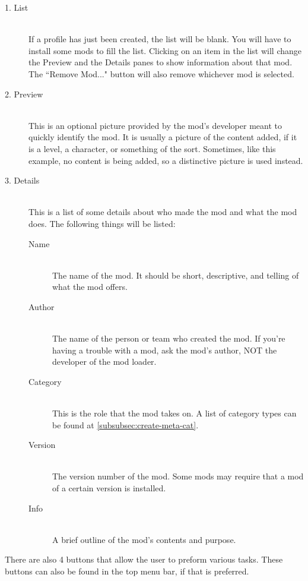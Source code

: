 \documentclass[12pt,a4paper,notitlepage]{article}
\begin{document}
\begin{description}
\item[1. List] \hfill \\
If a profile has just been created, the list will be blank. You will have to install some mods to fill the list. Clicking on an item in the list will change the Preview and the Details panes to show information about that mod. The ``Remove Mod..." button will also remove whichever mod is selected.

\item[2. Preview] \hfill \\
This is an optional picture provided by the mod's developer meant to quickly identify the mod. It is usually a picture of the content added, if it is a level, a character, or something of the sort. Sometimes, like this example, no content is being added, so a distinctive picture is used instead.

\item[3. Details] \hfill \\
This is a list of some details about who made the mod and what the mod does. The following things will be listed:

\begin{description}
\item[Name] \hfill \\ 
    The name of the mod. It should be short, descriptive, and telling of what the mod offers. 
\item[Author] \hfill \\
    The name of the person or team who created the mod. If you're having a trouble with a mod, ask the mod's author, NOT the developer of the mod loader.
\item[Category] \hfill \\
    This is the role that the mod takes on. A list of category types can be found at \ref{subsubsec:create-meta-cat}.
\item[Version] \hfill \\
    The version number of the mod. Some mods may require that a mod of a certain version is installed.
\item[Info] \hfill \\
    A brief outline of the mod's contents and purpose.
\end{description}
\end{description}

There are also 4 buttons that allow the user to preform various tasks. These buttons can also be found in the top menu bar, if that is preferred.
\end{document}
